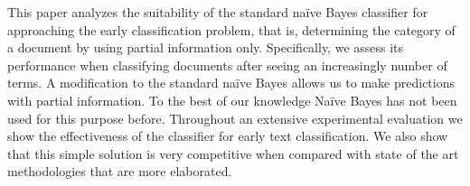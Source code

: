 This paper analyzes the suitability of the standard naïve Bayes classifier for approaching the early classification problem, that is, determining the category of a document by using partial information only. Specifically, we assess its performance when classifying documents after seeing  an increasingly number of terms. A modification to the standard naïve Bayes allows us to make predictions with partial information. To the best of our knowledge Naïve Bayes has not been used for this purpose before. Throughout an extensive experimental evaluation we show the effectiveness of the classifier for early text classification. We also show that this simple solution is very competitive when compared with state of the art methodologies that are more elaborated.
